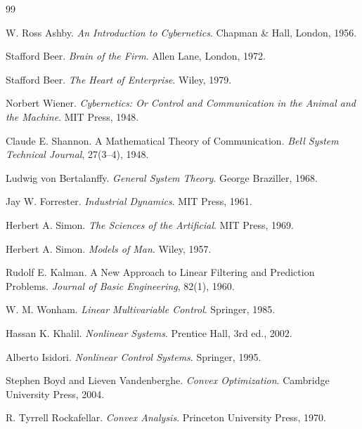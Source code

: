 \documentclass[12pt,a4paper]{article}
\begin{document}
\newpage

\begin{thebibliography}{99}

W. Ross Ashby.
\newblock \emph{An Introduction to Cybernetics}.
\newblock Chapman \& Hall, London, 1956.

Stafford Beer.
\newblock \emph{Brain of the Firm}.
\newblock Allen Lane, London, 1972.

Stafford Beer.
\newblock \emph{The Heart of Enterprise}.
\newblock Wiley, 1979.

Norbert Wiener.
\newblock \emph{Cybernetics: Or Control and Communication in the Animal and the Machine}.
\newblock MIT Press, 1948.

Claude E. Shannon.
\newblock A Mathematical Theory of Communication.
\newblock \emph{Bell System Technical Journal}, 27(3--4), 1948.

Ludwig von Bertalanffy.
\newblock \emph{General System Theory}.
\newblock George Braziller, 1968.

Jay W. Forrester.
\newblock \emph{Industrial Dynamics}.
\newblock MIT Press, 1961.

Herbert A. Simon.
\newblock \emph{The Sciences of the Artificial}.
\newblock MIT Press, 1969.

Herbert A. Simon.
\newblock \emph{Models of Man}.
\newblock Wiley, 1957.

Rudolf E. Kalman.
\newblock A New Approach to Linear Filtering and Prediction Problems.
\newblock \emph{Journal of Basic Engineering}, 82(1), 1960.

W. M. Wonham.
\newblock \emph{Linear Multivariable Control}.
\newblock Springer, 1985.

Hassan K. Khalil.
\newblock \emph{Nonlinear Systems}.
\newblock Prentice Hall, 3rd ed., 2002.

Alberto Isidori.
\newblock \emph{Nonlinear Control Systems}.
\newblock Springer, 1995.

Stephen Boyd and Lieven Vandenberghe.
\newblock \emph{Convex Optimization}.
\newblock Cambridge University Press, 2004.

R. Tyrrell Rockafellar.
\newblock \emph{Convex Analysis}.
\newblock Princeton University Press, 1970.


\end{thebibliography}
\end{document}
